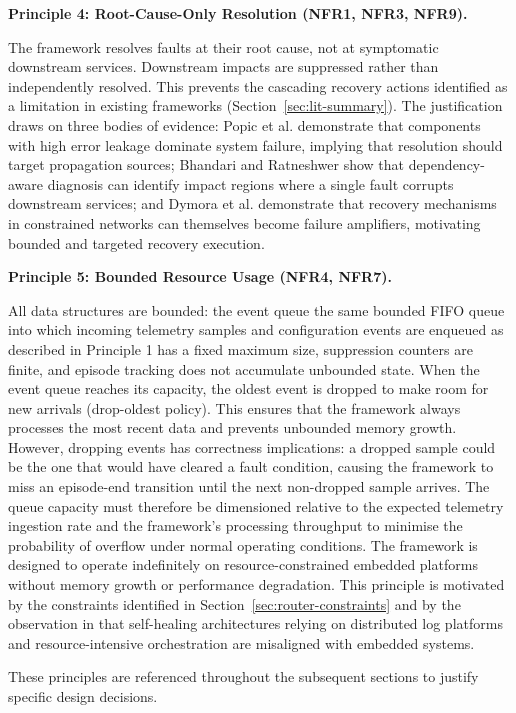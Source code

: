 \textbf{Principle 4: Root-Cause-Only Resolution (NFR1, NFR3, NFR9).}

The framework resolves faults at their root cause, not at symptomatic downstream services. Downstream impacts are suppressed rather than independently resolved. This prevents the cascading recovery actions identified as a limitation in existing frameworks (Section~\ref{sec:lit-summary}). The justification draws on three bodies of evidence: Popic et al. \cite{ref7} demonstrate that components with high error leakage dominate system failure, implying that resolution should target propagation sources; Bhandari and Ratneshwer \cite{ref10} show that dependency-aware diagnosis can identify impact regions where a single fault corrupts downstream services; and Dymora et al. \cite{ref16} demonstrate that recovery mechanisms in constrained networks can themselves become failure amplifiers, motivating bounded and targeted recovery execution.

\textbf{Principle 5: Bounded Resource Usage (NFR4, NFR7).}

All data structures are bounded: the event queue the same bounded FIFO queue into which incoming telemetry samples and configuration events are enqueued as described in Principle 1 has a fixed maximum size, suppression counters are finite, and episode tracking does not accumulate unbounded state. When the event queue reaches its capacity, the oldest event is dropped to make room for new arrivals (drop-oldest policy). This ensures that the framework always processes the most recent data and prevents unbounded memory growth. However, dropping events has correctness implications: a dropped sample could be the one that would have cleared a fault condition, causing the framework to miss an episode-end transition until the next non-dropped sample arrives. The queue capacity must therefore be dimensioned relative to the expected telemetry ingestion rate and the framework's processing throughput to minimise the probability of overflow under normal operating conditions. The framework is designed to operate indefinitely on resource-constrained embedded platforms without memory growth or performance degradation. This principle is motivated by the constraints identified in Section~\ref{sec:router-constraints} and by the observation in \cite{ref17} that self-healing architectures relying on distributed log platforms and resource-intensive orchestration are misaligned with embedded systems.

These principles are referenced throughout the subsequent sections to justify specific design decisions.

